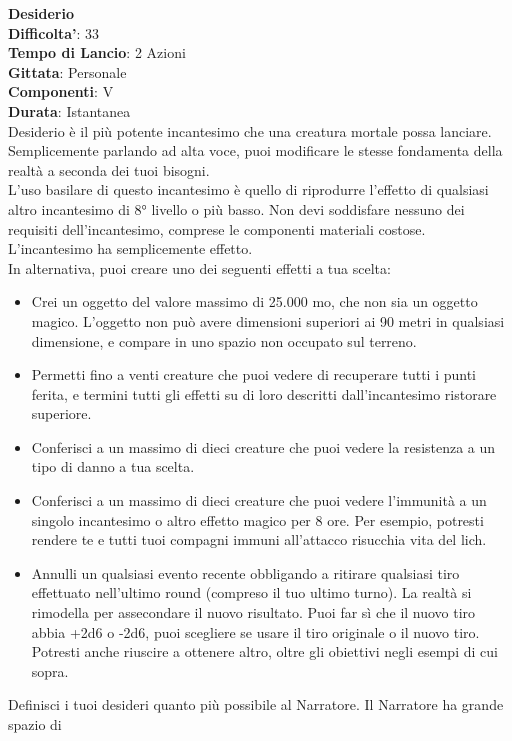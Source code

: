 \begin{multicols}{2}
\medskip\textbf{Desiderio}\\
\textbf{Difficolta'}: 33\\
\textbf{Tempo di Lancio}: 2 Azioni\\
\textbf{Gittata}: Personale\\
\textbf{Componenti}: V\\
\textbf{Durata}: Istantanea\\
Desiderio è il più potente incantesimo che una creatura mortale possa lanciare. Semplicemente parlando ad alta voce, puoi modificare le stesse fondamenta della realtà a seconda dei tuoi bisogni. \\
L’uso basilare di questo incantesimo è quello di riprodurre l’effetto di qualsiasi altro incantesimo di 8° livello o più basso. Non devi soddisfare nessuno dei requisiti dell’incantesimo, comprese le componenti materiali costose. L’incantesimo ha semplicemente
effetto.\\
In alternativa, puoi creare uno dei seguenti effetti a tua
scelta:
\begin{itemize}
	\item 
Crei un oggetto del valore massimo di 25.000 mo, che non sia un oggetto magico. L’oggetto non può avere dimensioni superiori ai 90 metri in qualsiasi dimensione, e compare in uno spazio non occupato sul terreno.
	\item 
Permetti fino a venti creature che puoi vedere di recuperare tutti i punti ferita, e termini tutti gli effetti su di loro descritti dall’incantesimo ristorare superiore. 
	\item 
Conferisci a un massimo di dieci creature che puoi vedere la resistenza a un tipo di danno a tua scelta.
	\item 
Conferisci a un massimo di dieci creature che puoi vedere l’immunità a un singolo incantesimo o altro effetto magico per 8 ore. Per esempio, potresti rendere te e tutti tuoi compagni immuni all’attacco risucchia vita del lich.
	\item 
Annulli un qualsiasi evento recente obbligando a ritirare qualsiasi tiro effettuato nell’ultimo round (compreso il tuo ultimo turno). La realtà si rimodella per assecondare il nuovo risultato. Puoi far sì che il nuovo tiro abbia +2d6 o -2d6, puoi scegliere se usare il tiro originale o il nuovo tiro. Potresti anche riuscire a ottenere altro, oltre gli obiettivi negli esempi di cui sopra.\\
\end{itemize}
\medskip
Definisci i tuoi desideri quanto più possibile al Narratore. Il Narratore ha grande spazio di

\end{multicols}
